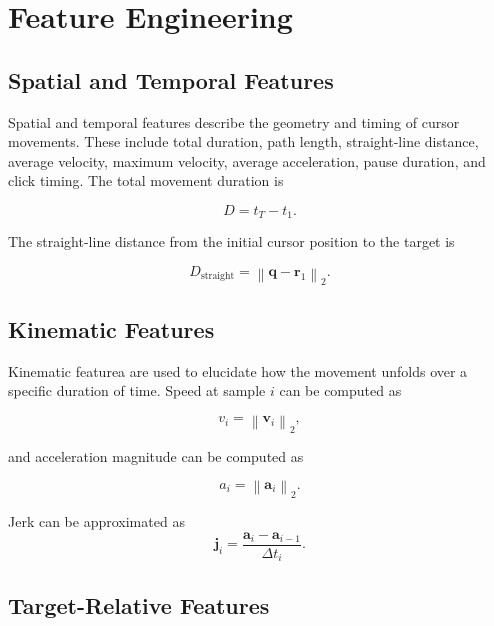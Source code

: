 \documentclass[conference]{IEEEtran}
\begin{document}
\section{Feature Engineering}

\subsection {Spatial and Temporal Features}

Spatial and temporal features describe the geometry and timing of cursor movements. These include total duration, path length, straight-line distance, average velocity, maximum velocity, average acceleration, pause duration, and click timing. The total movement duration is 

\begin{equation}
D = t_T - t_1.
\label{eq:movement_duration}
\end{equation}

The straight-line distance from the initial cursor position to the target is

\begin{equation}
D_{\mathrm{straight}}
=
\left\|
\mathbf{q}-\mathbf{r}_1
\right\|_2.
\label{eq:straight_distance}
\end{equation}

\subsection{Kinematic Features}

Kinematic featurea are used to elucidate how the movement unfolds over a specific duration of time. Speed at sample $i$ can be computed as 

\begin{equation}
v_i
=
\left\|
\mathbf{v}_i
\right\|_2,
\label{eq:speed}
\end{equation}

and acceleration magnitude can be computed as

\begin{equation}
a_i
=
\left\|
\mathbf{a}_i
\right\|_2.
\label{eq:acceleration_magnitude}
\end{equation}

Jerk can be approximated as
\begin{equation}
\mathbf{j}_i
=
\frac{\mathbf{a}_i-\mathbf{a}_{i-1}}{\Delta t_i}.
\label{eq:jerk}
\end{equation}

\subsection{Target-Relative Features}
\end{document}
